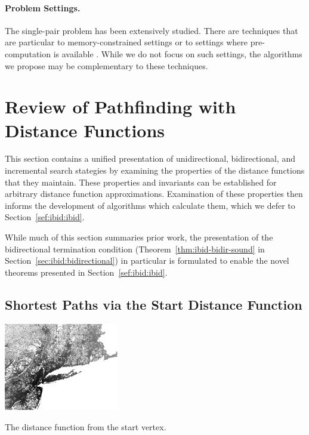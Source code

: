 \paragraph{Problem Settings.}
The single-pair problem has been extensively studied.
There are techniques that are particular to memory-constrained
settings \citep{kaindl1997biheurreconsidered}
or to settings where pre-computation is available
\citep{goldberg2007pointtopoint}.
While we do not focus on such settings,
the algorithms we propose may be complementary to these techniques.

\section{Review of Pathfinding with Distance Functions}
\label{sec:ibid:distance-functions}

This section contains a unified presentation of unidirectional,
bidirectional, and incremental search stategies
by examining the properties of the distance functions that they
maintain.
These properties and invariants can be established for arbitrary
distance function approximations.
Examination of these properties then informs the development of
algorithms which calculate them,
which we defer to Section~\ref{sef:ibid:ibid}.

While much of this section summaries prior work,
the presentation of the bidirectional termination condition
(Theorem~\ref{thm:ibid-bidir-sound}
in Section~\ref{sec:ibid:bidirectional})
in particular
is formulated to enable the novel theorems
presented in Section~\ref{sef:ibid:ibid}.

\subsection{Shortest Paths via the Start Distance Function}

\begin{marginfigure}%
   \centering%
   \includegraphics[width=5cm]{figs/incbi-road-ne/singleshot/example-dijkstraall.png}%
   \caption{The distance function from the start vertex.}%
   \label{fig:ibid:example-distance-all}%
\end{marginfigure}

